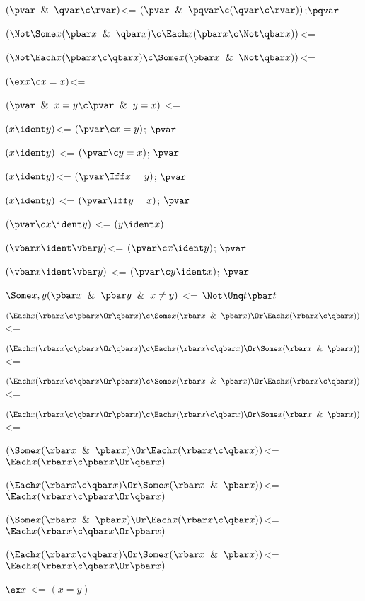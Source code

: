 $(\pvar \And \qvar \c \rvar)$<= $(\pvar \And \pqvar \c (\qvar \c \rvar))$;$\pqvar$

$(\Not \Some x (\pbar x \And \qbar x) \c \Each x (\pbar x \c \Not \qbar x))$<= 

$(\Not \Each x (\pbar x \c \qbar x) \c \Some x (\pbar x \And \Not \qbar x))$<= 


$(\ex x \c x = x)$<=

$(\pvar \And x = y \c \pvar \And y = x)$ <=

$(x \ident y) $<= $(\pvar \c x = y)$; $\pvar$

$(x \ident y)$ <= $(\pvar \c y = x)$; $\pvar$

$(x \ident y) $<= $(\pvar \Iff x = y)$; $\pvar$

$(x \ident y)$ <= $(\pvar \Iff y = x)$; $\pvar$

$(\pvar \c x \ident y)$ <= $(y \ident x)$

$(\vbar x \ident \vbar y) $<= $(\pvar \c x \ident y)$; $\pvar$

$(\vbar x \ident \vbar y)$ <= $(\pvar \c y \ident x)$; $\pvar$

$\Some x,y(\pbar x \And \pbar y \And x\ne y)$ <= $\Not\Unq t \pbar t$ 

$(\Each x (\rbar x \c \pbar x \Or \qbar x) \c \Some x(\rbar x \And \pbar x) \Or \Each x(\rbar x \c \qbar x))$<=

$(\Each x (\rbar x \c \pbar x \Or \qbar x) \c \Each x(\rbar x \c \qbar x)\Or \Some x(\rbar x \And \pbar x) )$<=

$(\Each x (\rbar x \c \qbar x \Or \pbar x) \c \Some x(\rbar x \And \pbar x) \Or \Each x(\rbar x \c \qbar x))$<=

$(\Each x (\rbar x \c \qbar x \Or \pbar x) \c \Each x(\rbar x \c \qbar x)\Or \Some x(\rbar x \And \pbar x) )$<=

$(\Some x(\rbar x \And \pbar x) \Or \Each x(\rbar x \c \qbar x))$<= $\Each x (\rbar x \c \pbar x \Or \qbar x)$

$(\Each x(\rbar x \c \qbar x)\Or \Some x(\rbar x \And \pbar x) )$<= $\Each x (\rbar x \c \pbar x \Or \qbar x)$

$(\Some x(\rbar x \And \pbar x) \Or \Each x(\rbar x \c \qbar x))$<= $\Each x (\rbar x \c \qbar x \Or \pbar x)$ 

$(\Each x(\rbar x \c \qbar x)\Or \Some x(\rbar x \And \pbar x) )$<= $\Each x (\rbar x \c \qbar x \Or \pbar x)$

$\ex x$ <= $(x = y)$


